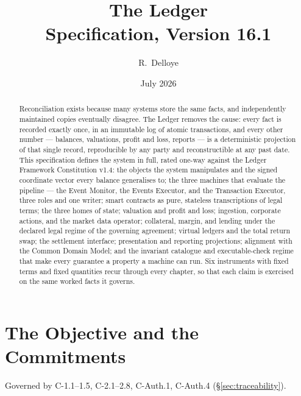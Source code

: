 \documentclass[11pt,a4paper]{article}
\title{The Ledger\\[6pt]
\large Specification, Version 16.1}
\author{R.\ Delloye}
\date{July 2026}
\begin{document}
\maketitle

\begingroup
\setlength{\parskip}{0pt}
\tableofcontents
\endgroup
\clearpage


\begin{abstract}
Reconciliation exists because many systems store the same facts, and independently
maintained copies eventually disagree. The Ledger removes the cause: every fact is
recorded exactly once, in an immutable log of atomic transactions, and every other
number --- balances, valuations, profit and loss, reports --- is a deterministic
projection of that single record, reproducible by any party and reconstructible at any
past date. This specification defines the system in full, rated one-way against the
Ledger Framework Constitution v1.4: the objects the system manipulates and the signed
coordinate vector every balance generalises to; the three machines that evaluate the
pipeline --- the Event Monitor, the Events Executor, and the Transaction Executor,
three roles and one writer; smart contracts as pure, stateless transcriptions of legal
terms; the three homes of state; valuation and profit and loss; ingestion, corporate
actions, and the market data operator; collateral, margin, and lending under the
declared legal regime of the governing agreement; virtual ledgers and the total return
swap; the settlement interface; presentation and reporting projections; alignment with
the Common Domain Model; and the invariant catalogue and executable-check regime that
make every guarantee a property a machine can run. Six instruments with fixed terms
and fixed quantities recur through every chapter, so that each claim is exercised on
the same worked facts it governs.
\end{abstract}

\tableofcontents
\clearpage

\section{The Objective and the Commitments}\label{ch:objective}

Governed by C-1.1--1.5, C-2.1--2.8, C-Auth.1, C-Auth.4 (\S\ref{sec:traceability}).
\end{document}
